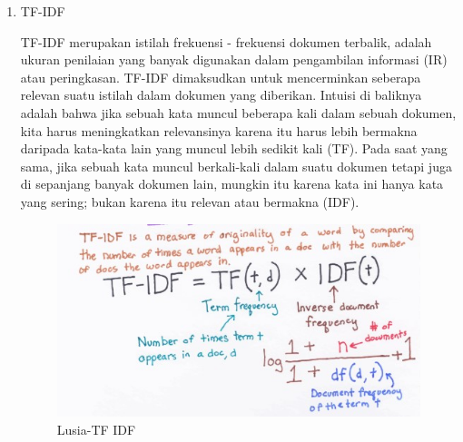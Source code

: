 \begin{enumerate}
\item TF-IDF
	\par TF-IDF merupakan istilah frekuensi - frekuensi dokumen terbalik, adalah ukuran penilaian yang banyak digunakan dalam pengambilan informasi (IR) atau peringkasan. TF-IDF dimaksudkan untuk mencerminkan seberapa relevan suatu istilah dalam dokumen yang diberikan. Intuisi di baliknya adalah bahwa jika sebuah kata muncul beberapa kali dalam sebuah dokumen, kita harus meningkatkan relevansinya karena itu harus lebih bermakna daripada kata-kata lain yang muncul lebih sedikit kali (TF). Pada saat yang sama, jika sebuah kata muncul berkali-kali dalam suatu dokumen tetapi juga di sepanjang banyak dokumen lain, mungkin itu karena kata ini hanya kata yang sering; bukan karena itu relevan atau bermakna (IDF).
	\begin{figure}[ht]
		\centering
		\includegraphics[scale=0.5]{figures/m6.jpg}
		\caption{Lusia-TF IDF}
		\label{contoh}
	\end{figure}
\end{enumerate}

